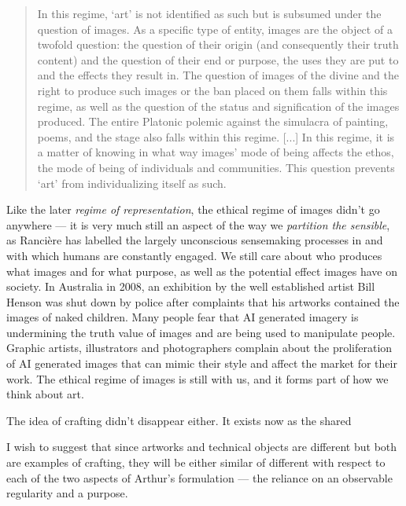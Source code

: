 \documentclass[letterpaper]{article}
\begin{document}
    \begin{quote}
        In this regime, ‘art’ is not identified as such but is subsumed under the question of images. As a specific type of entity, images are the object of a twofold question: the question of their origin (and consequently their truth content) and the question of their end or purpose, the uses they are put to and the effects they result in. The question of images of the divine and the right to produce such images or the ban placed on them falls within this regime, as well as the question of the status and signification of the images produced. The entire Platonic polemic against the simulacra of painting, poems, and the stage also falls within this regime. [...] In this regime, it is a matter of knowing in what way images' mode of being affects the ethos, the mode of being of individuals and communities. This question prevents ‘art’ from individualizing itself as such. \citep[pp.20-21]{RancierPltcsOfThAsthtcs2004}
    \end{quote}

    Like the later \emph{regime of representation}, the ethical regime of images didn't go anywhere — it is very much still an aspect of the way we \emph{partition the sensible}, as Rancière has labelled the largely unconscious sensemaking processes in and with which humans are constantly engaged. We still care about who produces what images and for what purpose, as well as the potential effect images have on society. In Australia in 2008, an exhibition by the well established artist Bill Henson was shut down by police after complaints that his artworks contained the images of naked children. Many people fear that AI generated imagery is undermining the truth value of images and are being used to manipulate people. Graphic artists, illustrators and photographers complain about the proliferation of AI generated images that can mimic their style and affect the market for their work. The ethical regime of images is still with us, and it forms part of how we think about art. 

    The idea of crafting didn't disappear either. It exists now as the shared 

    I wish to suggest that since artworks and technical objects are different but both are examples of crafting, they will be either similar of different with respect to each of the two aspects of Arthur's formulation — the reliance on an observable regularity and a purpose.

\end{document}
